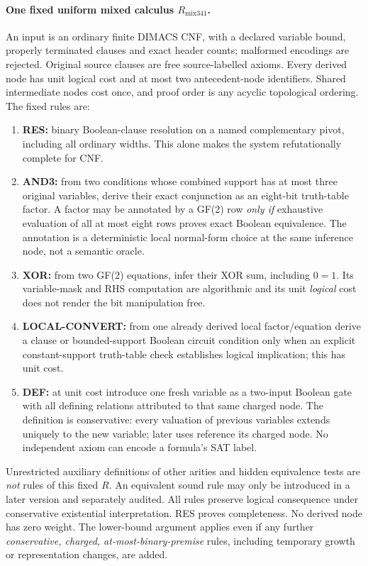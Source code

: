 \documentclass[11pt]{article}
\begin{document}
\paragraph{One fixed uniform mixed calculus $R_{\mathrm{mix341}}$.}
An input is an ordinary finite DIMACS CNF, with a declared variable bound, properly terminated clauses and exact header counts; malformed encodings are rejected. Original source clauses are free source-labelled axioms. Every derived node has unit logical cost and at most two antecedent-node identifiers. Shared intermediate nodes cost once, and proof order is any acyclic topological ordering. The fixed rules are:
\begin{enumerate}
\item[] \textbf{RES:} binary Boolean-clause resolution on a named complementary pivot, including all ordinary widths. This alone makes the system refutationally complete for CNF.
\item[] \textbf{AND3:} from two conditions whose combined support has at most three original variables, derive their exact conjunction as an eight-bit truth-table factor. A factor may be annotated by a GF(2) row \emph{only if} exhaustive evaluation of all at most eight rows proves exact Boolean equivalence. The annotation is a deterministic local normal-form choice at the same inference node, not a semantic oracle.
\item[] \textbf{XOR:} from two GF(2) equations, infer their XOR sum, including $0=1$. Its variable-mask and RHS computation are algorithmic and its unit \emph{logical} cost does not render the bit manipulation free.
\item[] \textbf{LOCAL-CONVERT:} from one already derived local factor/equation derive a clause or bounded-support Boolean circuit condition only when an explicit constant-support truth-table check establishes logical implication; this has unit cost.
\item[] \textbf{DEF:} at unit cost introduce one fresh variable as a two-input Boolean gate with all defining relations attributed to that same charged node. The definition is conservative: every valuation of previous variables extends uniquely to the new variable; later uses reference its charged node. No independent axiom can encode a formula's SAT label.
\end{enumerate}
Unrestricted auxiliary definitions of other arities and hidden equivalence tests are \emph{not} rules of this fixed $R$. An equivalent sound rule may only be introduced in a later version and separately audited. All rules preserve logical consequence under conservative existential interpretation. RES proves completeness. No derived node has zero weight. The lower-bound argument applies even if any further \emph{conservative, charged, at-most-binary-premise} rules, including temporary growth or representation changes, are added.
\end{document}
